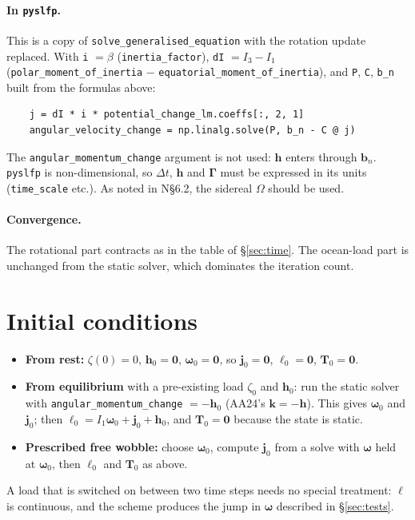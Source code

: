\documentclass[11pt,a4paper]{article}
\DeclareRobustCommand{\bw}{\bm{\omega}}
\DeclareRobustCommand{\bj}{\mathbf{j}}
\DeclareRobustCommand{\bh}{\mathbf{h}}
\DeclareRobustCommand{\bk}{\mathbf{k}}
\DeclareRobustCommand{\bl}{\bm{\ell}}
\DeclareRobustCommand{\bT}{\mathbf{T}}
\newcommand{\bGam}{\bm{\Gamma}}
\begin{document}
\paragraph{In \texttt{pyslfp}.} \sloppy This is a copy of \texttt{solve\_generalised\_equation} with the rotation
update replaced. With \texttt{i} $=\beta$ (\texttt{inertia\_factor}), \texttt{dI} $=I_3-I_1$
(\texttt{polar\_moment\_of\_inertia} $-$ \texttt{equatorial\_moment\_of\_inertia}), and
\texttt{P}, \texttt{C}, \texttt{b\_n} built from the formulas above:
\begin{verbatim}
    j = dI * i * potential_change_lm.coeffs[:, 2, 1]
    angular_velocity_change = np.linalg.solve(P, b_n - C @ j)
\end{verbatim}
The \texttt{angular\_momentum\_change} argument is not used: $\bh$ enters through $\mathbf{b}_n$.
\texttt{pyslfp} is non-dimensional, so $\Delta t$, $\bh$ and $\bGam$ must be expressed in its units
(\texttt{time\_scale} etc.). As noted in N\S6.2, the sidereal $\Omega$ should be used.

\paragraph{Convergence.} The rotational part contracts as in the table of \S\ref{sec:time}. The
ocean-load part is unchanged from the static solver, which dominates the iteration count.

\section{Initial conditions}
\label{sec:ic}

\begin{itemize}
  \item \textbf{From rest:} $\zeta(0)=0$, $\bh_0=\mathbf{0}$, $\bw_0=\mathbf{0}$, so $\bj_0=\mathbf{0}$,
  $\bl_0=\mathbf{0}$, $\bT_0=\mathbf{0}$.
  \item \sloppy\textbf{From equilibrium} with a pre-existing load $\zeta_0$ and $\bh_0$: run the static solver with
  \texttt{angular\_momentum\_change} $=-\bh_0$ (AA24's $\bk=-\bh$). This gives $\bw_0$ and $\bj_0$; then
  $\bl_0=I_1\bw_0+\bj_0+\bh_0$, and $\bT_0=\mathbf{0}$ because the state is static.
  \item \textbf{Prescribed free wobble:} choose $\bw_0$, compute $\bj_0$ from a solve with $\bw$ held at
  $\bw_0$, then $\bl_0$ and $\bT_0$ as above.
\end{itemize}
A load that is switched on between two time steps needs no special treatment: $\bl$ is continuous, and
the scheme produces the jump in $\bw$ described in \S\ref{sec:tests}.
\end{document}
